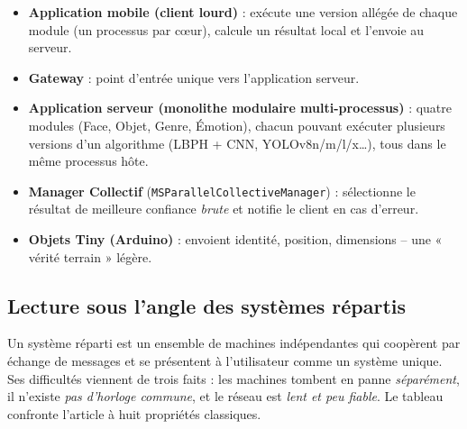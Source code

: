 \documentclass[11pt,a4paper]{article}
\begin{document}
\begin{itemize}
    \item \textbf{Application mobile (client lourd)} : exécute une version allégée de chaque module (un processus par cœur), calcule un résultat local et l'envoie au serveur.
    \item \textbf{Gateway} : point d'entrée unique vers l'application serveur.
    \item \textbf{Application serveur (monolithe modulaire multi-processus)} : quatre modules (Face, Objet, Genre, Émotion), chacun pouvant exécuter plusieurs versions d'un algorithme (LBPH + CNN, YOLOv8n/m/l/x\ldots), tous dans le même processus hôte.
    \item \textbf{Manager Collectif} (\texttt{MSParallelCollectiveManager}) : sélectionne le résultat de meilleure confiance \emph{brute} et notifie le client en cas d'erreur.
    \item \textbf{Objets Tiny (Arduino)} : envoient identité, position, dimensions -- une « vérité terrain » légère.
\end{itemize}

\subsection{Lecture sous l'angle des systèmes répartis}

Un système réparti est un ensemble de machines indépendantes qui coopèrent par échange de messages et se présentent à l'utilisateur comme un système unique. Ses difficultés viennent de trois faits : les machines tombent en panne \emph{séparément}, il n'existe \emph{pas d'horloge commune}, et le réseau est \emph{lent et peu fiable}. Le tableau confronte l'article à huit propriétés classiques.
\end{document}
